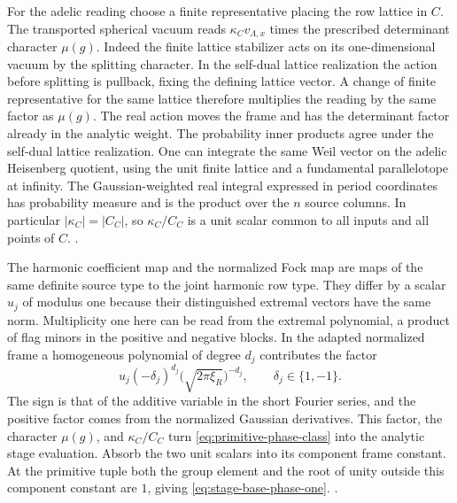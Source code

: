 For the adelic reading choose a finite representative
placing the row lattice in \(C\). The transported
spherical vacuum reads \(\kappa_C v_{\Lambda,x}\) times
the prescribed determinant character \(\mu(g)\).
Indeed the finite lattice stabilizer acts on its
one-dimensional vacuum by the splitting character.
In the self-dual lattice realization the action before
splitting is pullback, fixing the defining lattice
vector. A change of finite representative for the
same lattice therefore multiplies the reading by the
same factor as \(\mu(g)\). The real action moves the
frame and has the determinant factor already in
the analytic weight. The probability inner products
agree under the self-dual lattice realization.
One can integrate the same Weil vector on the
adelic Heisenberg quotient, using the unit finite
lattice and a fundamental parallelotope at infinity.
The Gaussian-weighted real integral expressed in
period coordinates has probability measure and
is the product over the \(n\) source columns.
In particular \(|\kappa_C|=|C_C|\), so
\(\kappa_C/C_C\) is a unit scalar common to all inputs
and all points of \(C\).
.

The harmonic coefficient map and the normalized Fock
map are maps of the same definite source type to the
joint harmonic row type. They differ by a scalar
\(u_j\) of modulus one because their distinguished
extremal vectors have the same norm. Multiplicity one
here can be read from the extremal polynomial, a
product of flag minors in the positive and negative
blocks. In the adapted normalized frame a homogeneous
polynomial of degree \(d_j\) contributes the factor
\[
 u_j(-\delta_j)^{d_j}
       \bigl(\sqrt{2\pi\xi_R}\bigr)^{-d_j},
 \qquad \delta_j\in\{1,-1\}.
\]
The sign is that of the additive variable in the
short Fourier series, and the positive factor comes
from the normalized Gaussian derivatives. This factor,
the character \(\mu(g)\), and \(\kappa_C/C_C\) turn
\eqref{eq:primitive-phase-class} into the analytic
stage evaluation. Absorb the two unit scalars
into its component frame constant. At the primitive
tuple both the group element and the root of unity
outside this component constant are \(1\), giving
\eqref{eq:stage-base-phase-one}.
.


